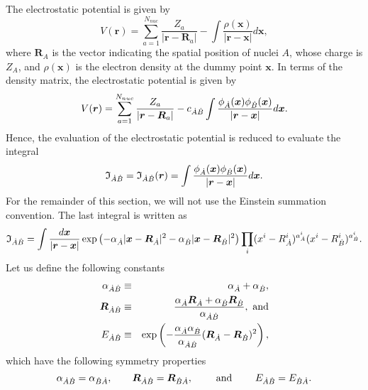 The electrostatic potential is given by
%
\begin{equation}
   V(\boldsymbol{r})=\sum_{a=1}^{N_{nuc}}\frac{Z_a}{|\boldsymbol{r}-\boldsymbol{R}_a|}-\int\frac{\rho(\boldsymbol{x})}{|\boldsymbol{r}-\boldsymbol{x}|}d\boldsymbol{x},
\end{equation}
%
where $\boldsymbol{R}_A$ is the vector indicating the spatial position of nuclei $A$, whose charge is $Z_A$, and $\rho(\boldsymbol{x})$ is the electron density at the dummy point $\boldsymbol{x}$. In terms of the density matrix, the electrostatic potential is given by
%
\begin{equation}
   V(\boldsymbol{r})=\sum_{a=1}^{N_{nuc}}\frac{Z_a}{|\boldsymbol{r}-\boldsymbol{R}_a|}-c_{\dot{A}\dot{B}}\int\frac{\phi_{\dot{A}}(\boldsymbol{x})\phi_{\dot{B}}(\boldsymbol{x})}{|\boldsymbol{r}-\boldsymbol{x}|}d\boldsymbol{x}.
\end{equation}
%
Hence, the evaluation of the electrostatic potential is reduced to evaluate the integral
%
\begin{equation}
   \mathfrak{I}_{\dot{A}\dot{B}}=\mathfrak{I}_{\dot{A}\dot{B}}(\boldsymbol{r})=\int\frac{\phi_{\dot{A}}(\boldsymbol{x})\phi_{\dot{B}}(\boldsymbol{x})}{|\boldsymbol{r}-\boldsymbol{x}|}d\boldsymbol{x}.
\end{equation}
%
For the remainder of this section, we will not use the Einstein summation convention. The last integral is written as
%
\begin{equation}
\mathfrak{I}_{\dot{A}\dot{B}}=\int\frac{d\boldsymbol{x}}{|\boldsymbol{r}-\boldsymbol{x}|}
                   \exp\left(-\alpha_{\dot{A}}|\boldsymbol{x}-\boldsymbol{R}_{\dot{A}}|^2
                             -\alpha_{\dot{B}}|\boldsymbol{x}-\boldsymbol{R}_{\dot{B}}|^2\right)
                   \prod_i(x^i-R_{\dot{A}}^i)^{a_{\dot{A}}^i}(x^i-R_{\dot{B}}^i)^{a_{\dot{B}}^i}.
\end{equation}
%
Let us define the following constants
%
\begin{eqnarray}
   \alpha_{\dot{A}\dot{B}}&\equiv&\alpha_{\dot{A}}+\alpha_{\dot{B}},\\
   \boldsymbol{R}_{\dot{A}\dot{B}}&\equiv&\frac{\alpha_{\dot{A}}\boldsymbol{R}_{\dot{A}}+\alpha_{\dot{B}}\boldsymbol{R}_{\dot{B}}}{\alpha_{\dot{A}\dot{B}}}, \textrm{\ and}\\
   E_{\dot{A}\dot{B}}&\equiv&\exp\left(-\frac{\alpha_{\dot{A}}\alpha_{\dot{B}}}{\alpha_{\dot{A}\dot{B}}}(\boldsymbol{R}_{\dot{A}}-\boldsymbol{R}_{\dot{B}})^2\right),
\end{eqnarray}
%
which have the following symmetry properties
\begin{equation}
   \alpha_{\dot{A}\dot{B}}=\alpha_{\dot{B}\dot{A}},\qquad\boldsymbol{R}_{\dot{A}\dot{B}}=\boldsymbol{R}_{\dot{B}\dot{A}},\qquad\textrm{ and }
   \qquad E_{\dot{A}\dot{B}}=E_{\dot{B}\dot{A}}.
\end{equation}
